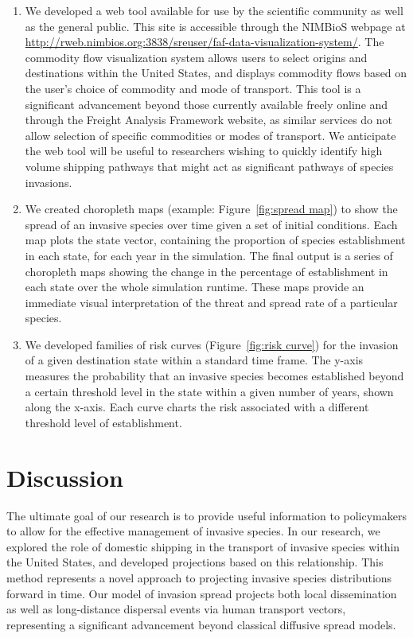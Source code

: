 \documentclass[12pt]{article}
\begin{document}
\begin{enumerate}

\item  We developed a web tool available for use by the scientific community as well as the general public. This site is accessible through the NIMBioS webpage at \url{http://rweb.nimbios.org:3838/sreuser/faf-data-visualization-system/}. The commodity flow visualization system allows users to select origins and destinations within the United States, and displays commodity flows based on the user's choice of commodity and mode of transport. This tool is a significant advancement beyond those currently available freely online and through the Freight Analysis Framework website, as similar services do not allow selection of specific commodities or modes of transport. We anticipate the web tool will be useful to researchers wishing to quickly identify high volume shipping pathways that might act as significant pathways of species invasions. 

\item We created choropleth maps (example: Figure~\ref{fig:spread map}) to show the spread of an invasive species over time given a set of initial conditions. Each map plots the state vector, containing the proportion of species establishment in each state, for each year in the simulation. The final output is a series of choropleth maps showing the change in the percentage of establishment in each state over the whole simulation runtime. These maps provide an immediate visual interpretation of the threat and spread rate of a particular species. 

\item We developed families of risk curves (Figure~\ref{fig:risk curve}) for the invasion of a given destination state within a standard time frame. The y-axis measures the probability that an invasive species becomes established beyond a certain threshold level in the state within a given number of years, shown along the x-axis. Each curve charts the risk associated with a different threshold level of establishment.

\end{enumerate}


\section*{Discussion}

The ultimate goal of our research is to provide useful information to policymakers to allow for the effective management of invasive species. In our research, we explored the role of domestic shipping in the transport of invasive species within the United States, and developed projections based on this relationship. This method represents a novel approach to projecting invasive species distributions forward in time. Our model of invasion spread projects both local dissemination as well as long-distance dispersal events via human transport vectors, representing a significant advancement beyond classical diffusive spread models.
\end{document}
